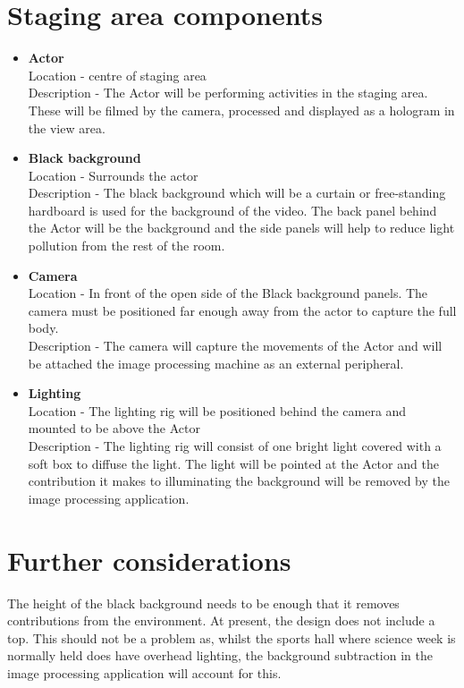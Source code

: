 \documentclass{article}
\begin{document}
\section{Staging area components}
\begin{itemize}
	\item \textbf{Actor}\\
	Location - centre of staging area \\
	Description - The Actor will be performing activities in the staging area. These will be filmed by the camera, processed and displayed as a hologram in the view area.
	
	\item \textbf{Black background}\\
	Location - Surrounds the actor\\
	Description - The black background which will be a curtain or free-standing hardboard is used for the background of the video. The back panel behind the Actor will be the background and the side panels will help to reduce light pollution from the rest of the room.
	
	\item \textbf{Camera}\\
	Location - In front of the open side of the Black background panels. The camera must be positioned far enough away from the actor to capture the full body.\\
	Description - The camera will capture the movements of the Actor and will be attached the image processing machine as an external peripheral. 
	
	\item \textbf{Lighting}\\
	Location - The lighting rig will be positioned behind the camera and mounted to be above the Actor \\
	Description - The lighting rig will consist of one bright light covered with a soft box to diffuse the light. The light will be pointed at the Actor and the contribution it makes to illuminating the background will be removed by the image processing application.

\end{itemize}

\section{Further considerations}
The height of the black background needs to be enough that it removes contributions from the environment. At present, the design does not include a top. This should not be a problem as, whilst the sports hall where science week is normally held does have overhead lighting, the background subtraction in the image processing application will account for this.
\end{document}
